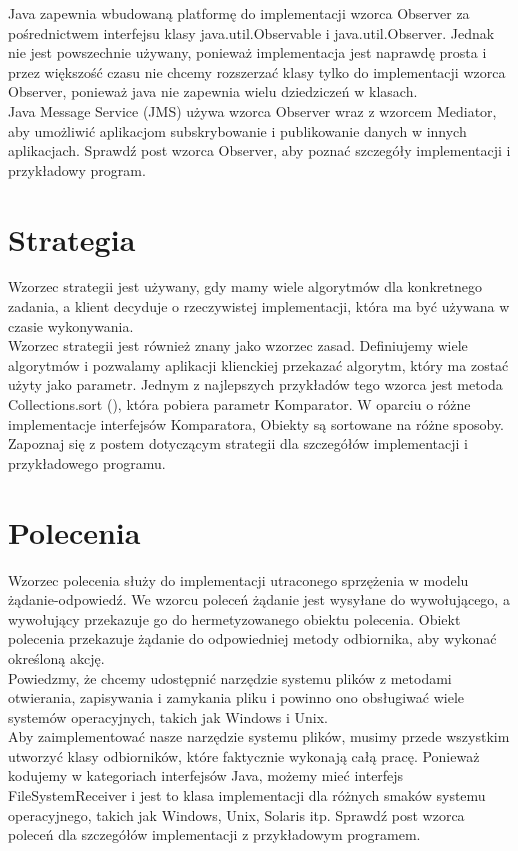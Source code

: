 \documentclass[12pt,a4paper]{article}
\begin{document}
	Java zapewnia wbudowaną platformę do implementacji wzorca Observer za pośrednictwem interfejsu klasy java.util.Observable i java.util.Observer. Jednak nie jest powszechnie używany, ponieważ implementacja jest naprawdę prosta i przez większość czasu nie chcemy rozszerzać klasy tylko do implementacji wzorca Observer, ponieważ java nie zapewnia wielu dziedziczeń w klasach.
	\\
	Java Message Service (JMS) używa wzorca Observer wraz z wzorcem Mediator, aby umożliwić aplikacjom subskrybowanie i publikowanie danych w innych aplikacjach. Sprawdź post wzorca Observer, aby poznać szczegóły implementacji i przykładowy program\cite{PankajKumar}.
	\section{Strategia}
	Wzorzec strategii jest używany, gdy mamy wiele algorytmów dla konkretnego zadania, a klient decyduje o rzeczywistej implementacji, która ma być używana w czasie wykonywania.\\
	Wzorzec strategii jest również znany jako wzorzec zasad. Definiujemy wiele algorytmów i pozwalamy aplikacji klienckiej przekazać algorytm, który ma zostać użyty jako parametr. Jednym z najlepszych przykładów tego wzorca jest metoda Collections.sort (), która pobiera parametr Komparator. W oparciu o różne implementacje interfejsów Komparatora, Obiekty są sortowane na różne sposoby.\\
	Zapoznaj się z postem dotyczącym strategii dla szczegółów implementacji i przykładowego programu\cite{PankajKumar}.
	\section{Polecenia}
	Wzorzec polecenia służy do implementacji utraconego sprzężenia w modelu żądanie-odpowiedź. We wzorcu poleceń żądanie jest wysyłane do wywołującego, a wywołujący przekazuje go do hermetyzowanego obiektu polecenia. Obiekt polecenia przekazuje żądanie do odpowiedniej metody odbiornika, aby wykonać określoną akcję.\\
	Powiedzmy, że chcemy udostępnić narzędzie systemu plików z metodami otwierania, zapisywania i zamykania pliku i powinno ono obsługiwać wiele systemów operacyjnych, takich jak Windows i Unix.\\
	Aby zaimplementować nasze narzędzie systemu plików, musimy przede wszystkim utworzyć klasy odbiorników, które faktycznie wykonają całą pracę. Ponieważ kodujemy w kategoriach interfejsów Java, możemy mieć interfejs FileSystemReceiver i jest to klasa implementacji dla różnych smaków systemu operacyjnego, takich jak Windows, Unix, Solaris itp. Sprawdź post wzorca poleceń dla szczegółów implementacji z przykładowym programem\cite{PankajKumar}.
\end{document}
